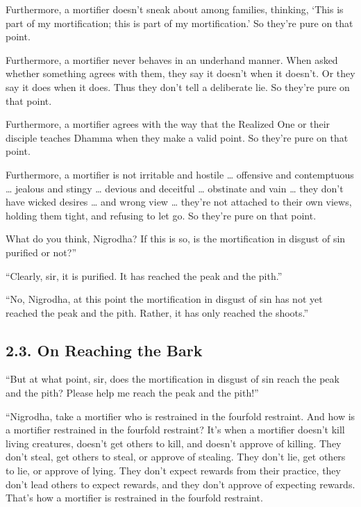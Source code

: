 \documentclass[12pt,openany]{book}%
\begin{document}
Furthermore, a mortifier doesn’t sneak about among families, thinking, ‘This is part of my mortification; this is part of my mortification.’ So they’re pure on that point. 

Furthermore, a mortifier never behaves in an underhand manner. When asked whether something agrees with them, they say it doesn’t when it doesn’t. Or they say it does when it does. Thus they don’t tell a deliberate lie. So they’re pure on that point. 

Furthermore, a mortifier agrees with the way that the Realized One or their disciple teaches Dhamma when they make a valid point. So they’re pure on that point. 

Furthermore, a mortifier is not irritable and hostile … offensive and contemptuous … jealous and stingy … devious and deceitful … obstinate and vain … they don’t have wicked desires … and wrong view … they’re not attached to their own views, holding them tight, and refusing to let go. So they’re pure on that point. 

What do you think, Nigrodha? If this is so, is the mortification in disgust of sin purified or not?” 

“Clearly, sir, it is purified. It has reached the peak and the pith.” 

“No, Nigrodha, at this point the mortification in disgust of sin has not yet reached the peak and the pith. Rather, it has only reached the shoots.” 

\subsection*{2.3. On Reaching the Bark }

“But at what point, sir, does the mortification in disgust of sin reach the peak and the pith? Please help me reach the peak and the pith!” 

“Nigrodha, take a mortifier who is restrained in the fourfold restraint. And how is a mortifier restrained in the fourfold restraint? It’s when a mortifier doesn’t kill living creatures, doesn’t get others to kill, and doesn’t approve of killing. They don’t steal, get others to steal, or approve of stealing. They don’t lie, get others to lie, or approve of lying. They don’t expect rewards from their practice, they don’t lead others to expect rewards, and they don’t approve of expecting rewards. That’s how a mortifier is restrained in the fourfold restraint. 
\end{document}
